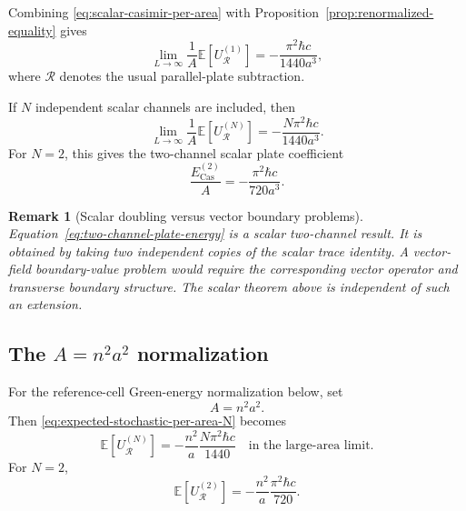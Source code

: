 \documentclass[11pt]{article}
\newtheorem{remark}[theorem]{Remark}
\newcommand{\E}{\mathbb{E}}
\begin{document}
Combining \eqref{eq:scalar-casimir-per-area} with Proposition~\ref{prop:renormalized-equality} gives
\begin{equation}
    \lim_{L\to\infty}\frac{1}{A}\E[U_{\mathcal{R}}^{(1)}]
    =-\frac{\pi^2\hbar c}{1440a^3},
    \label{eq:expected-stochastic-per-area-scalar}
\end{equation}
where $\mathcal{R}$ denotes the usual parallel-plate subtraction.

If $N$ independent scalar channels are included, then
\begin{equation}
    \lim_{L\to\infty}\frac{1}{A}\E[U_{\mathcal{R}}^{(N)}]
    =-\frac{N\pi^2\hbar c}{1440a^3}.
    \label{eq:expected-stochastic-per-area-N}
\end{equation}
For $N=2$, this gives the two-channel scalar plate coefficient
\begin{equation}
    \frac{E_{\mathrm{Cas}}^{(2)}}{A}
    =-\frac{\pi^2\hbar c}{720a^3}.
    \label{eq:two-channel-plate-energy}
\end{equation}

\begin{remark}[Scalar doubling versus vector boundary problems]
Equation~\eqref{eq:two-channel-plate-energy} is a scalar two-channel result.  It is obtained by taking two independent copies of the scalar trace identity.  A vector-field boundary-value problem would require the corresponding vector operator and transverse boundary structure.  The scalar theorem above is independent of such an extension.
\end{remark}

\subsection{The \texorpdfstring{$A=n^2a^2$}{A = n squared a squared} normalization}

For the reference-cell Green-energy normalization below, set
\[
    A=n^2a^2.
\]
Then \eqref{eq:expected-stochastic-per-area-N} becomes
\begin{equation}
    \E[U_{\mathcal{R}}^{(N)}]
    =-\frac{n^2}{a}\frac{N\pi^2\hbar c}{1440}
    \quad\text{in the large-area limit.}
    \label{eq:expected-stochastic-n-a}
\end{equation}
For $N=2$,
\begin{equation}
    \E[U_{\mathcal{R}}^{(2)}]
    =-\frac{n^2}{a}\frac{\pi^2\hbar c}{720}.
    \label{eq:expected-stochastic-two-channel-na}
\end{equation}
\end{document}
